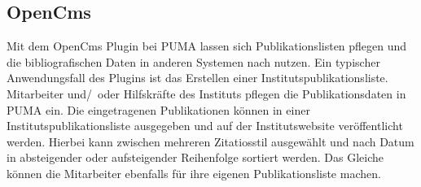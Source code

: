 \subsection{OpenCms}
\label{subsec:opencms}
Mit dem OpenCms Plugin bei PUMA lassen sich Publikationslisten pflegen und die bibliografischen Daten in anderen Systemen nach nutzen. Ein typischer Anwendungsfall des Plugins ist das Erstellen einer Institutspublikationsliste. Mitarbeiter und/~oder Hilfskräfte des Instituts pflegen die Publikationsdaten in PUMA ein. Die eingetragenen Publikationen können in einer Institutspublikationsliste ausgegeben und auf der Institutswebsite veröffentlicht werden. Hierbei kann zwischen mehreren Zitatiosstil ausgewählt und nach Datum in absteigender oder aufsteigender Reihenfolge sortiert werden. Das Gleiche können die Mitarbeiter ebenfalls für ihre eigenen Publikationsliste machen.
